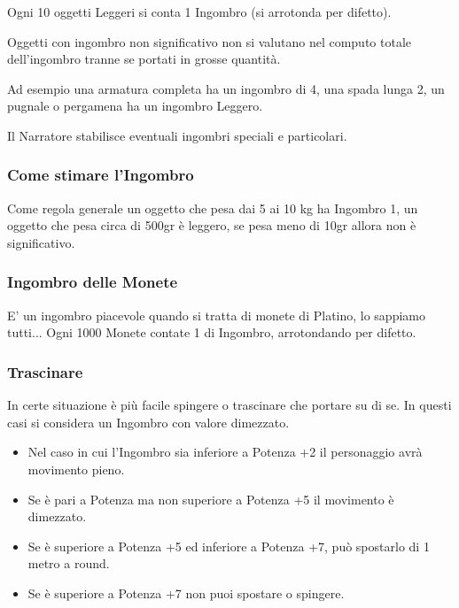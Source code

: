 \documentclass[a4paper,11pt,twoside,openany]{book}
\begin{document}
Ogni 10 oggetti Leggeri si conta 1 Ingombro (si arrotonda per difetto).

Oggetti con ingombro non significativo non si valutano nel computo totale dell'ingombro tranne se portati in grosse quantità.

Ad esempio una armatura completa ha un ingombro di 4, una spada lunga 2, un pugnale o pergamena ha un ingombro Leggero.

Il Narratore stabilisce eventuali ingombri speciali e particolari.

\subsubsection{Come stimare l'Ingombro}

Come regola generale un oggetto che pesa dai 5 ai 10 kg ha Ingombro 1, un oggetto che pesa circa di 500gr è leggero, se pesa meno di 10gr allora non è significativo.

\subsubsection{Ingombro delle Monete}

E' un ingombro piacevole quando si tratta di monete di Platino, lo sappiamo tutti...
Ogni 1000 Monete contate 1 di Ingombro, arrotondando per difetto.


\subsubsection{Trascinare}

In certe situazione è più facile spingere o trascinare che portare su di se.
In questi casi si considera un Ingombro con valore dimezzato.

\begin{itemize}
	\item Nel caso in cui l'Ingombro sia inferiore a Potenza +2 il personaggio avrà movimento pieno.

	\item Se è pari a Potenza ma non superiore a Potenza +5 il movimento è dimezzato.

	\item Se è superiore a Potenza +5 ed inferiore a Potenza +7, può spostarlo di 1 metro a round.

	\item Se è superiore a Potenza +7 non puoi spostare o spingere.
\end{itemize}
\end{document}
